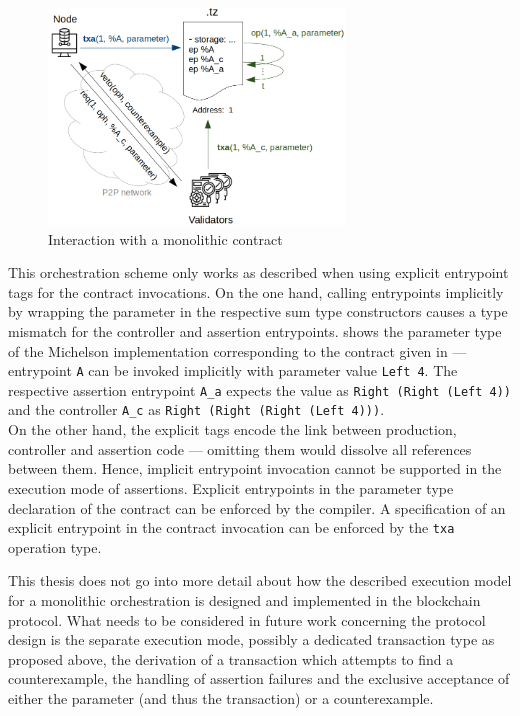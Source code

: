 \begin{figure}
\centering
  \includegraphics[width=0.7\textwidth]{figures/5-offline_tezos/interaction_monolithic_2}
	\caption{Interaction with a monolithic contract}
	\label{fig:interaction_monolithic}
\end{figure}

This orchestration scheme only works as described when using explicit entrypoint tags for the contract invocations. On the one hand, calling entrypoints implicitly by wrapping the parameter in the respective sum type constructors causes a type mismatch for the controller and assertion entrypoints.  shows the parameter type of the Michelson implementation corresponding to the contract given in  --- entrypoint \texttt{A} can be invoked implicitly with parameter value \texttt{Left 4}. The respective assertion entrypoint \texttt{A\_a} expects the value as \texttt{Right (Right (Left 4))} and the controller \texttt{A\_c} as \texttt{Right (Right (Right (Left 4)))}.\\
On the other hand, the explicit tags encode the link between production, controller and assertion code --- omitting them would dissolve all references between them. Hence, implicit entrypoint invocation cannot be supported in the execution mode of assertions. Explicit entrypoints in the parameter type declaration of the contract can be enforced by the compiler. A specification of an explicit entrypoint in the contract invocation can be enforced by the \texttt{txa} operation type.


This thesis does not go into more detail about how the described execution model for a monolithic orchestration is designed and implemented in the blockchain protocol. What needs to be considered in future work concerning the protocol design is the separate execution mode, possibly a dedicated transaction type as proposed above, the derivation of a transaction which attempts to find a counterexample, the handling of assertion failures and the exclusive acceptance of either the parameter (and thus the transaction) or a counterexample.

